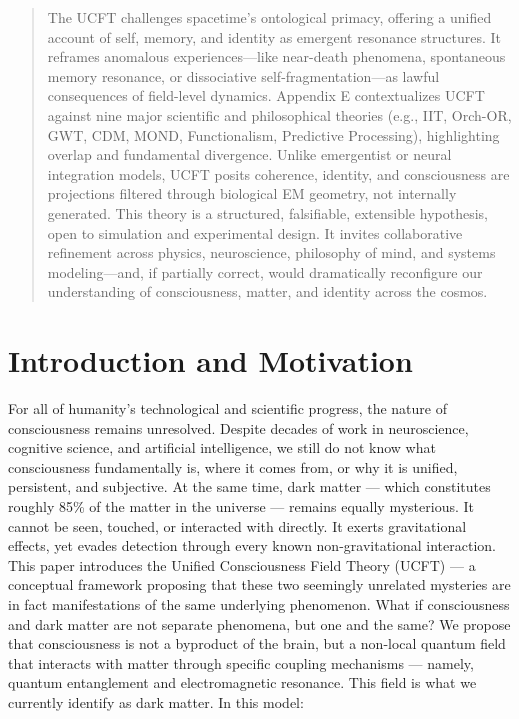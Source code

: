 \documentclass[titlepage]{article}
\begin{document}
\begin{abstract}
The UCFT challenges spacetime's ontological primacy, offering a unified account of self, memory, and identity as emergent resonance structures. It reframes anomalous experiences—like near-death phenomena, spontaneous memory resonance, or dissociative self-fragmentation—as lawful consequences of field-level dynamics.
Appendix E contextualizes UCFT against nine major scientific and philosophical theories (e.g., IIT, Orch-OR, GWT, CDM, MOND, Functionalism, Predictive Processing), highlighting overlap and fundamental divergence. Unlike emergentist or neural integration models, UCFT posits coherence, identity, and consciousness are projections filtered through biological EM geometry, not internally generated.
This theory is a structured, falsifiable, extensible hypothesis, open to simulation and experimental design. It invites collaborative refinement across physics, neuroscience, philosophy of mind, and systems modeling—and, if partially correct, would dramatically reconfigure our understanding of consciousness, matter, and identity across the cosmos.
\end{abstract}

\cleardoublepage
\setcounter{page}{2}  
\tableofcontents
\cleardoublepage

\setcounter{page}{1}  
\section{Introduction and Motivation}
For all of humanity’s technological and scientific progress, the nature of consciousness remains unresolved. Despite decades of work in neuroscience, cognitive science, and artificial intelligence, we still do not know what consciousness fundamentally is, where it comes from, or why it is unified, persistent, and subjective.
At the same time, dark matter — which constitutes roughly 85\% of the matter in the universe \parencite{planck2020cosmological} — remains equally mysterious. It cannot be seen, touched, or interacted with directly. It exerts gravitational effects, yet evades detection through every known non-gravitational interaction.
This paper introduces the Unified Consciousness Field Theory (UCFT) — a conceptual framework proposing that these two seemingly unrelated mysteries are in fact manifestations of the same underlying phenomenon.
What if consciousness and dark matter are not separate phenomena, but one and the same?
We propose that consciousness is not a byproduct of the brain, but a non-local quantum field that interacts with matter through specific coupling mechanisms — namely, quantum entanglement and electromagnetic resonance. This field is what we currently identify as dark matter.
In this model:
\end{document}

